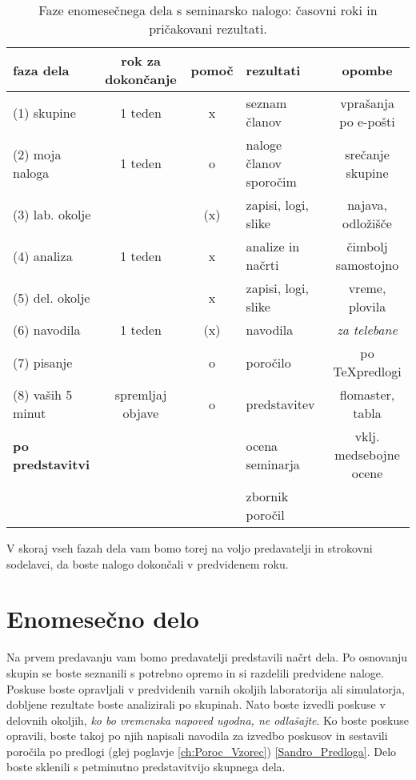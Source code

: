 \begin{table}[!htbp] 
	\caption{Faze enomesečnega dela s seminarsko nalogo: časovni roki in pričakovani rezultati.}
	\vspace{2mm}
	\begin{center}
		{\small
			\begin{tabular}{l||c|c|l|c}\hline
			faza dela	   & rok za dokončanje & pomoč & rezultati 			     & opombe \\ \hline \hline
			(1) skupine    & 1 teden           & x     & seznam članov           & vprašanja po e-pošti\\ \hline
			(2) moja naloga& 1 teden           & o     & naloge članov sporočim & srečanje skupine\\ \hline
			(3) lab. okolje&                   & (x)   & zapisi, logi, slike     & najava, odložišče \\ \hline
			(4) analiza	   & 1 teden           & x     & analize in načrti    	 & čimbolj samostojno\\ \hline
			(5) del. okolje&                   & x     & zapisi, logi, slike     & vreme, plovila  \\ \hline
			(6) navodila   & 1 teden           & (x)   & navodila                &\textit{za telebane}\\ \hline
			(7) pisanje	   &                   & o     & poročilo                & po \TeX predlogi \\ \hline
			(8) vaših 5 minut& spremljaj objave& o     & predstavitev            & flomaster, tabla \\ \hline
			\textbf{po predstavitvi}&          &       & ocena seminarja         & vklj. medsebojne ocene\\ \hline
				            &                  &       & zbornik poročil         &      \\ \hline
			\end{tabular}
		}
	\end{center}
	\label{tab:faze_dela}
\end{table}

V skoraj vseh fazah dela vam bomo torej na voljo predavatelji in strokovni sodelavci, da boste nalogo dokončali v predvidenem roku.

\section{Enomesečno delo}
\label{sec:OpisDela}

Na prvem predavanju vam bomo predavatelji predstavili načrt dela. Po osnovanju skupin se boste seznanili s potrebno opremo in si razdelili predvidene naloge. Poskuse boste opravljali v predvidenih varnih okoljih laboratorija ali simulatorja, dobljene rezultate boste analizirali po skupinah. Nato boste izvedli poskuse v delovnih okoljih, \textit{ko bo vremenska napoved ugodna, ne odlašajte}. Ko boste poskuse opravili, boste takoj po njih napisali navodila za izvedbo poskusov in sestavili poročila po predlogi (glej poglavje \ref{ch:Poroc_Vzorec}) \ref{Sandro_Predloga}. Delo boste sklenili s petminutno predstavitvijo skupnega dela.     

